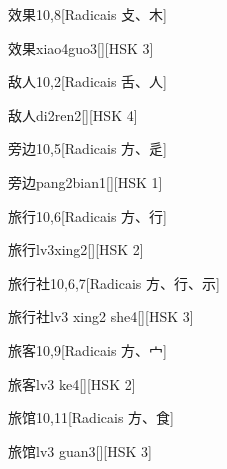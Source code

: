 \begin{entry}{效果}{10,8}[Radicais ⽁、⽊]
  \begin{phonetics}{效果}{xiao4guo3}[][HSK 3]
  \end{phonetics}
\end{entry}

\begin{entry}{敌人}{10,2}[Radicais ⾆、⼈]
  \begin{phonetics}{敌人}{di2ren2}[][HSK 4]
  \end{phonetics}
\end{entry}

\begin{entry}{旁边}{10,5}[Radicais ⽅、⾡]
  \begin{phonetics}{旁边}{pang2bian1}[][HSK 1]
  \end{phonetics}
\end{entry}

\begin{entry}{旅行}{10,6}[Radicais ⽅、⾏]
  \begin{phonetics}{旅行}{lv3xing2}[][HSK 2]
  \end{phonetics}
\end{entry}

\begin{entry}{旅行社}{10,6,7}[Radicais ⽅、⾏、⽰]
  \begin{phonetics}{旅行社}{lv3 xing2 she4}[][HSK 3]
  \end{phonetics}
\end{entry}

\begin{entry}{旅客}{10,9}[Radicais ⽅、⼧]
  \begin{phonetics}{旅客}{lv3 ke4}[][HSK 2]
  \end{phonetics}
\end{entry}

\begin{entry}{旅馆}{10,11}[Radicais ⽅、⾷]
  \begin{phonetics}{旅馆}{lv3 guan3}[][HSK 3]
  \end{phonetics}
\end{entry}

